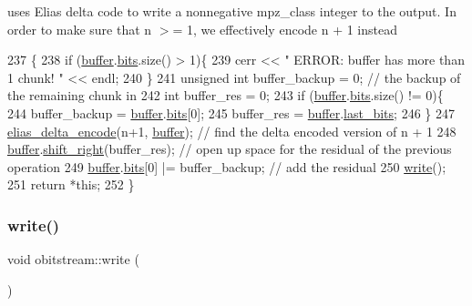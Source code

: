 uses Elias delta code to write a nonnegative mpz\+\_\+class integer to the output. In order to make sure that n $>$= 1, we effectively encode n + 1 instead 


\begin{DoxyCode}
237                                                       \{
238   \textcolor{keywordflow}{if} (\hyperlink{classobitstream_aeaccad00a395a404aa16472bfa052be3}{buffer}.\hyperlink{classbit__pipe_a86f38af1e9736b053728033490476b50}{bits}.size() > 1)\{
239     cerr << \textcolor{stringliteral}{" ERROR: buffer has more than 1 chunk! "} << endl;
240   \}
241   \textcolor{keywordtype}{unsigned} \textcolor{keywordtype}{int} buffer\_backup = 0; \textcolor{comment}{// the backup of the remaining chunk in }
242   \textcolor{keywordtype}{int} buffer\_res = 0; 
243   \textcolor{keywordflow}{if} (\hyperlink{classobitstream_aeaccad00a395a404aa16472bfa052be3}{buffer}.\hyperlink{classbit__pipe_a86f38af1e9736b053728033490476b50}{bits}.size() != 0)\{
244     buffer\_backup = \hyperlink{classobitstream_aeaccad00a395a404aa16472bfa052be3}{buffer}.\hyperlink{classbit__pipe_a86f38af1e9736b053728033490476b50}{bits}[0];
245     buffer\_res = \hyperlink{classobitstream_aeaccad00a395a404aa16472bfa052be3}{buffer}.\hyperlink{classbit__pipe_a0f3e84b02751803adaab499b5dad86fe}{last\_bits};
246   \}
247   \hyperlink{bitstream_8cpp_a63daa014203b9a5b2622a264cbfdff7b}{elias\_delta\_encode}(n+1, \hyperlink{classobitstream_aeaccad00a395a404aa16472bfa052be3}{buffer}); \textcolor{comment}{// find the delta encoded version of n + 1 }
248   \hyperlink{classobitstream_aeaccad00a395a404aa16472bfa052be3}{buffer}.\hyperlink{classbit__pipe_a341a1f62d728a67f730503ca722a7770}{shift\_right}(buffer\_res); \textcolor{comment}{// open up space for the residual of the previous
       operation}
249   \hyperlink{classobitstream_aeaccad00a395a404aa16472bfa052be3}{buffer}.\hyperlink{classbit__pipe_a86f38af1e9736b053728033490476b50}{bits}[0] |= buffer\_backup; \textcolor{comment}{// add the residual}
250   \hyperlink{classobitstream_a5ac23633932baad040856f0a33ee1ebf}{write}();
251   \textcolor{keywordflow}{return} *\textcolor{keyword}{this};
252 \}
\end{DoxyCode}
\mbox{\label{classobitstream_a5ac23633932baad040856f0a33ee1ebf}} 
\subsubsection{\texorpdfstring{write()}{write()}}
{\footnotesize\ttfamily void obitstream\+::write (\begin{DoxyParamCaption}{ }\end{DoxyParamCaption})\hspace{0.3cm}{\ttfamily [private]}}



